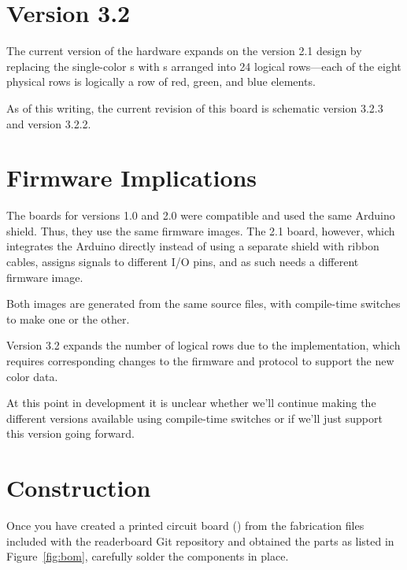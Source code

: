 \section{Version 3.2}
The current version of the hardware expands on the version 2.1 design by replacing the single-color s with
 s arranged into 24 logical rows---each of the eight physical rows is logically a row of red,
green, and blue  elements.

As of this writing, the current revision of this board is schematic version 3.2.3 and  version 3.2.2.

\section{Firmware Implications}
The boards for versions 1.0 and 2.0 were compatible and used the same Arduino shield. Thus, they
use the same firmware images. The 2.1 board, however, which integrates the Arduino directly instead
of using a separate shield with ribbon cables, assigns signals to different I/O pins, and as such
needs a different firmware image. 

Both images are generated from the same source files, with compile-time switches to make one or the other.

Version 3.2 expands the number of logical rows due to the  implementation, which requires
corresponding changes to the firmware and protocol to support the new color data.

{\color{red} At this point in development it is unclear whether we'll continue making the different versions
available using compile-time switches or if we'll just support this version going forward.}


\section{Construction}
Once you have created a printed circuit board () from the fabrication files included with the
readerboard Git repository and obtained the parts as listed in Figure~\ref{fig:bom}, carefully solder the components
in place. 

